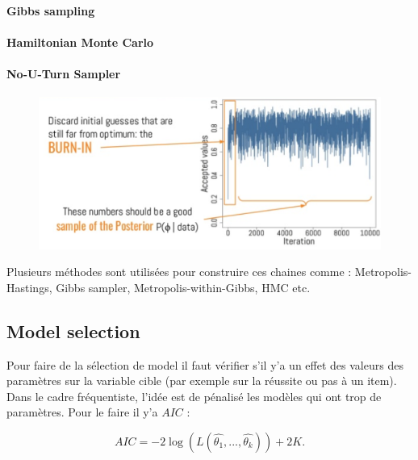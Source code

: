 \paragraph{Gibbs sampling}
\paragraph{Hamiltonian Monte Carlo}
\paragraph{No-U-Turn Sampler}

\begin{figure}[H]
	\begin{center}
		\includegraphics[width=\textwidth]{images/chapitre5/mcmc_iterations.png}
	\end{center}
	\caption{}
	\label{mcmc_iterations}
\end{figure}

Plusieurs méthodes sont utilisées pour construire ces chaines comme : Metropolis-Hastings, Gibbs sampler, Metropolis-within-Gibbs, HMC etc.

\subsection{Model selection}
Pour faire de la sélection de model il faut vérifier s’il y’a un effet des valeurs des paramètres sur la variable cible (par exemple sur la réussite ou pas à un item). \\
Dans le cadre fréquentiste, l’idée est de pénalisé les modèles qui ont trop de paramètres. Pour le faire il y’a \(\displaystyle AIC \)  :

\begin{equation}
	AIC = -2 \log (L(\widehat{\theta_{1}},...,\widehat{\theta_{k}} )) + 2K.
	\label{aic_formula}
\end{equation}

